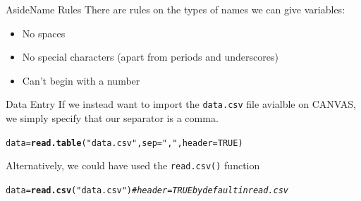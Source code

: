 \documentclass[xcolor=svgnames, 10pt]{beamer}
\makeatletter
\newcommand{\hlnum}[1]{\textcolor[rgb]{0.686,0.059,0.569}{#1}}%
\newcommand{\hlstr}[1]{\textcolor[rgb]{0.192,0.494,0.8}{#1}}%
\newcommand{\hlcom}[1]{\textcolor[rgb]{0.678,0.584,0.686}{\textit{#1}}}%
\newcommand{\hlstd}[1]{\textcolor[rgb]{0.345,0.345,0.345}{#1}}%
\newcommand{\hlkwb}[1]{\textcolor[rgb]{0.69,0.353,0.396}{#1}}%
\newcommand{\hlkwc}[1]{\textcolor[rgb]{0.333,0.667,0.333}{#1}}%
\newcommand{\hlkwd}[1]{\textcolor[rgb]{0.737,0.353,0.396}{\textbf{#1}}}%
\newenvironment{kframe}{%
 \def\at@end@of@kframe{}%
 \ifinner\ifhmode%
  \def\at@end@of@kframe{\end{minipage}}%
  \begin{minipage}{\columnwidth}%
 \fi\fi%
 \def\FrameCommand##1{\hskip\@totalleftmargin \hskip-\fboxsep
 \colorbox{shadecolor}{##1}\hskip-\fboxsep
     \hskip-\linewidth \hskip-\@totalleftmargin \hskip\columnwidth}%
 \MakeFramed {\advance\hsize-\width
   \@totalleftmargin\z@ \linewidth\hsize
   \@setminipage}}%
 {\par\unskip\endMakeFramed%
 \at@end@of@kframe}
\newenvironment{knitrout}{}{} %
\makeatother
\begin{document}
\begin{frame}[fragile]{Aside}{Name Rules}
There are rules on the types of names we can give variables:
\begin{itemize}
\item No spaces
\item No special characters (apart from periods and underscores)
\item Can't begin with a number
\end{itemize}
\end{frame}

\begin{frame}[fragile]{Data Entry}
If we instead want to import the {\tt data.csv} file avialble on CANVAS, we simply specify that our separator is a comma.
\begin{knitrout}\footnotesize
{}\color{fgcolor}\begin{kframe}
\begin{alltt}
\hlstd{data} \hlkwb{=} \hlkwd{read.table}\hlstd{(}\hlstr{"data.csv"}\hlstd{,} \hlkwc{sep}\hlstd{=}\hlstr{","}\hlstd{,} \hlkwc{header}\hlstd{=}\hlnum{TRUE}\hlstd{)}
\end{alltt}
\end{kframe}
\end{knitrout}
Alternatively, we could have used the {\tt read.csv()} function
\begin{knitrout}\footnotesize
{}\color{fgcolor}\begin{kframe}
\begin{alltt}
\hlstd{data} \hlkwb{=} \hlkwd{read.csv}\hlstd{(}\hlstr{"data.csv"}\hlstd{)} \hlcom{# header=TRUE by default in read.csv}
\end{alltt}
\end{kframe}
\end{knitrout}
\end{frame}
\end{document}
